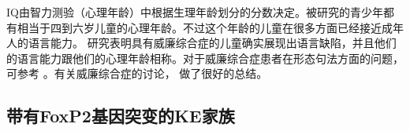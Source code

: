 IQ由智力测验（心理年龄）中根据生理年龄划分的分数决定。被研究的青少年都有相当于四到六岁儿童的心理年龄。不过这个年龄的儿童在很多方面已经接近成年人的语言能力。 \citet*[]{GSP94a}研究表明具有威廉综合症的儿童确实展现出语言缺陷，并且他们的语言能力跟他们的心理年龄相称。对于威廉综合症患者在形态句法方面的问题，可参考 。有关威廉综合症的讨论， 做了很好的总结。

\subsection{带有FoxP2基因突变的KE家族}

